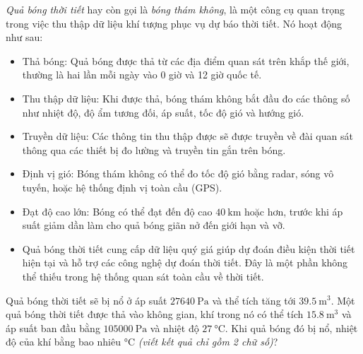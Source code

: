 \begin{ex}
	\textit{Quả bóng thời tiết} hay còn gọi là \textit{bóng thám không}, là một công cụ quan trọng trong việc thu thập dữ liệu khí tượng phục vụ dự báo thời tiết. Nó hoạt động như sau:
	\begin{itemize}
		\item Thả bóng: Quả bóng được thả từ các địa điểm quan sát trên khắp thế giới, thường là hai lần mỗi ngày vào 0 giờ và 12 giờ quốc tế.
		\item Thu thập dữ liệu: Khi được thả, bóng thám không bắt đầu đo các thông số như nhiệt độ, độ ẩm tương đối, áp suất, tốc độ gió và hướng gió.
		\item Truyền dữ liệu: Các thông tin thu thập được sẽ được truyền về đài quan sát thông qua các thiết bị đo lường và truyền tin gắn trên bóng.
		\item Định vị gió: Bóng thám không có thể đo tốc độ gió bằng radar, sóng vô tuyến, hoặc hệ thống định vị toàn cầu (GPS).
		\item Đạt độ cao lớn: Bóng có thể đạt đến độ cao $\SI{40}{\kilo\meter}$ hoặc hơn, trước khi áp suất giảm dần làm cho quả bóng giãn nở đến giới hạn và vỡ.
		\item Quả bóng thời tiết cung cấp dữ liệu quý giá giúp dự đoán điều kiện thời tiết hiện tại và hỗ trợ các công nghệ dự đoán thời tiết. Đây là một phần không thể thiếu trong hệ thống quan sát toàn cầu về thời tiết.
	\end{itemize}
Quả bóng thời tiết sẽ bị nổ ở áp suất $\SI{27640}{\pascal}$ và thể tích tăng tới $\SI{39.5}{\meter^3}$. Một quả bóng thời tiết được thả vào không gian, khí trong nó có thể tích $\SI{15.8}{\meter^3}$ và áp suất ban đầu bằng $\SI{105000}{\pascal}$ và nhiệt độ $\SI{27}{\celsius}$. Khi quả bóng đó bị nổ, nhiệt độ của khí bằng bao nhiêu $\si{\celsius}$ \textit{(viết kết quả chỉ gồm 2 chữ số)}?
\end{ex}
